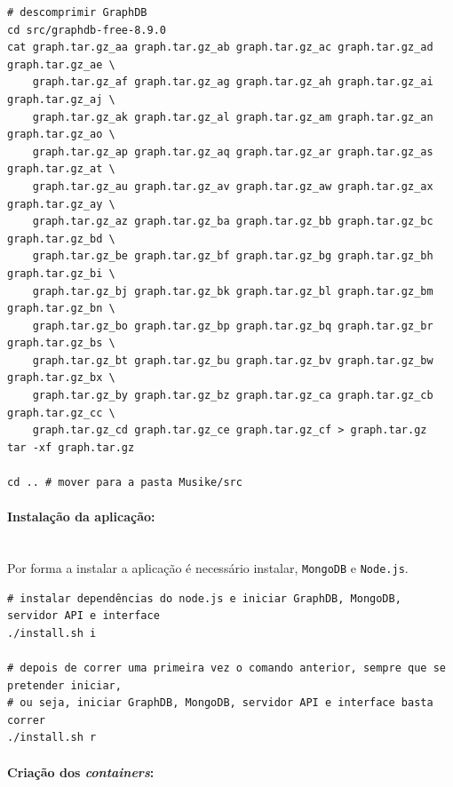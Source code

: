 \documentclass{article}
\begin{document}
\begin{framed}
\begin{verbatim}
# descomprimir GraphDB
cd src/graphdb-free-8.9.0
cat graph.tar.gz_aa graph.tar.gz_ab graph.tar.gz_ac graph.tar.gz_ad graph.tar.gz_ae \
    graph.tar.gz_af graph.tar.gz_ag graph.tar.gz_ah graph.tar.gz_ai graph.tar.gz_aj \
    graph.tar.gz_ak graph.tar.gz_al graph.tar.gz_am graph.tar.gz_an graph.tar.gz_ao \
    graph.tar.gz_ap graph.tar.gz_aq graph.tar.gz_ar graph.tar.gz_as graph.tar.gz_at \
    graph.tar.gz_au graph.tar.gz_av graph.tar.gz_aw graph.tar.gz_ax graph.tar.gz_ay \
    graph.tar.gz_az graph.tar.gz_ba graph.tar.gz_bb graph.tar.gz_bc graph.tar.gz_bd \
    graph.tar.gz_be graph.tar.gz_bf graph.tar.gz_bg graph.tar.gz_bh graph.tar.gz_bi \
    graph.tar.gz_bj graph.tar.gz_bk graph.tar.gz_bl graph.tar.gz_bm graph.tar.gz_bn \
    graph.tar.gz_bo graph.tar.gz_bp graph.tar.gz_bq graph.tar.gz_br graph.tar.gz_bs \
    graph.tar.gz_bt graph.tar.gz_bu graph.tar.gz_bv graph.tar.gz_bw graph.tar.gz_bx \
    graph.tar.gz_by graph.tar.gz_bz graph.tar.gz_ca graph.tar.gz_cb graph.tar.gz_cc \
    graph.tar.gz_cd graph.tar.gz_ce graph.tar.gz_cf > graph.tar.gz
tar -xf graph.tar.gz

cd .. # mover para a pasta Musike/src
\end{verbatim}
\end{framed}

\paragraph{Instalação da aplicação:}\mbox{}\\

Por forma a instalar a aplicação é necessário instalar, \texttt{MongoDB} e \texttt{Node.js}.

\begin{framed}
\begin{verbatim}
# instalar dependências do node.js e iniciar GraphDB, MongoDB, servidor API e interface
./install.sh i

# depois de correr uma primeira vez o comando anterior, sempre que se pretender iniciar,
# ou seja, iniciar GraphDB, MongoDB, servidor API e interface basta correr
./install.sh r
\end{verbatim}
\end{framed}

\paragraph{Criação dos \textit{containers}:}\mbox{}\\
\end{document}
